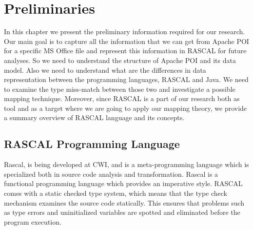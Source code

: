 
\chapter{Preliminaries} %

\label{Chapter2} %


%
%
%

In this chapter we present the preliminary information required for our research. Our main goal is to capture all the information that we can get from Apache POI for a specific MS Office file and represent this information in RASCAL for future analyses. So we need to understand the structure of Apache POI and its data model. Also we need to understand what are the differences in data representation between the programming languages, RASCAL and Java. We need to examine the type miss-match between those two and investigate a possible mapping technique. Moreover, since RASCAL is a part of our research both as tool and as a target where we are going to apply our mapping theory, we provide a summary overview of RASCAL language and its concepts. 

\section{RASCAL Programming Language}

Rascal, is being developed at CWI, and is a meta-programming language which is specialized both in source code analysis and transformation. Rascal is a functional programming language\cite{SEN-1111} which provides an imperative style. RASCAL comes with a static checked type system, which means that the type check mechanism examines the source code statically\cite{rascalstatic}. This ensures that problems such as type errors and uninitialized variables are spotted and eliminated before the program execution.

